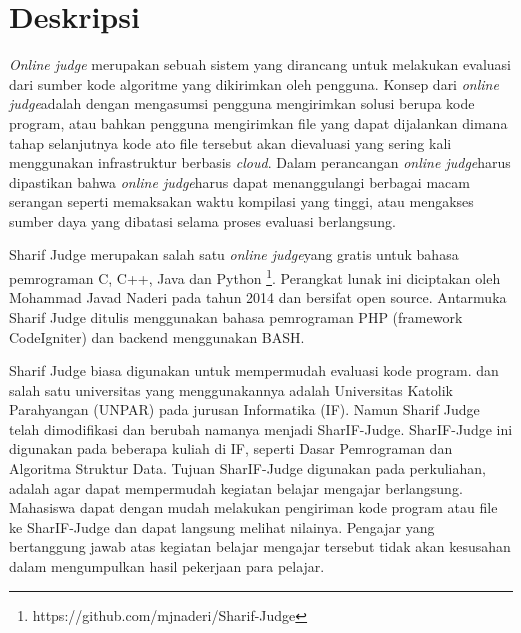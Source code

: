 \documentclass[a4paper,twoside]{article}
\newcommand{\oj}{\textit{online judge}}
\begin{document}
\title{\@judultopik}
\author{\nama \textendash \@npm} 

\newcommand{\nama}{Edwin Pranajaya}
\newcommand{\@npm}{2017730027}
\newcommand{\@judultopik}{Dukungan Bahasa JavaScript pada SharIF Judge} %
\newcommand{\jumpemb}{1} %
\newcommand{\tanggal}{22/02/2022}


\maketitle


\section{Deskripsi}

\textit{Online judge} merupakan sebuah sistem yang dirancang untuk melakukan evaluasi dari sumber kode algoritme yang dikirimkan oleh pengguna. Konsep dari \oj adalah dengan mengasumsi pengguna mengirimkan solusi berupa kode program, atau bahkan pengguna mengirimkan file yang dapat dijalankan dimana tahap selanjutnya kode ato file tersebut akan dievaluasi yang sering kali menggunakan infrastruktur berbasis \textit{cloud}. Dalam perancangan \oj harus dipastikan bahwa \oj harus dapat menanggulangi berbagai macam serangan seperti memaksakan waktu kompilasi yang tinggi, atau mengakses sumber daya yang dibatasi selama proses evaluasi berlangsung.

Sharif Judge merupakan salah satu \oj yang gratis untuk bahasa pemrograman C, C++, Java dan Python \footnote{https://github.com/mjnaderi/Sharif-Judge}. Perangkat lunak ini diciptakan oleh Mohammad Javad Naderi pada tahun 2014 dan bersifat open source. Antarmuka Sharif Judge ditulis menggunakan bahasa pemrograman PHP (framework CodeIgniter) dan backend menggunakan BASH.

Sharif Judge biasa digunakan untuk mempermudah evaluasi kode program. dan salah satu universitas yang menggunakannya adalah Universitas Katolik Parahyangan (UNPAR) pada jurusan Informatika (IF). Namun Sharif Judge telah dimodifikasi dan berubah namanya menjadi SharIF-Judge. SharIF-Judge ini digunakan pada beberapa kuliah di IF, seperti Dasar Pemrograman dan Algoritma Struktur Data. Tujuan SharIF-Judge digunakan pada perkuliahan, adalah agar dapat mempermudah kegiatan belajar mengajar berlangsung. Mahasiswa dapat dengan mudah melakukan pengiriman kode program atau file ke SharIF-Judge dan dapat langsung melihat nilainya. Pengajar yang bertanggung jawab atas kegiatan belajar mengajar tersebut tidak akan kesusahan dalam mengumpulkan hasil pekerjaan para pelajar. 
\end{document}
